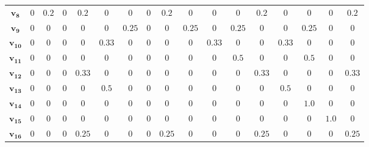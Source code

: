 \documentclass[twocolumn]{svjour3}          \smartqed
\begin{document}
\begin{table*}[ht]
{\begin{threeparttable}
\begin{tabular}{ccccccccccccccccc}
		$\mathbf{v_8}$ 		& 	$0  $	&	$0.2$	&	$0  $	& 	$0.2$
							& 	$0  $	&	$0  $	&	$0  $	& 	$0.2$
							& 	$0  $	&	$0  $	&	$0  $	& 	$0.2$
							& 	$0  $	&	$0  $	&	$0  $	& 	$0.2$	\\
							
		$\mathbf{v_9}$ 		& 	$0  $	&	$0  $	&	$0  $	& 	$0  $
							& 	$0  $	&	$0.25$	&	$0  $	& 	$0  $
							& 	$0.25$	&	$0  $	&	$0.25$	& 	$0  $
							& 	$0  $	&	$0.25$	&	$0  $	& 	$0  $	\\
							
		$\mathbf{v_{10}}$ 	& 	$0  $	&	$0  $	&	$0  $	& 	$0  $
							& 	$0.33$	&	$0  $	&	$0  $	& 	$0  $
							& 	$0  $	&	$0.33$	&	$0  $	& 	$0  $
							& 	$0.33$	&	$0  $	&	$0  $	& 	$0  $	\\
							
		$\mathbf{v_{11}}$ 	& 	$0  $	&	$0  $	&	$0  $	& 	$0  $
							& 	$0  $	&	$0  $	&	$0  $	& 	$0  $
							& 	$0  $	&	$0  $	&	$0.5$	& 	$0  $
							& 	$0  $	&	$0.5$	&	$0  $	& 	$0  $	\\
							
		$\mathbf{v_{12}}$ 	& 	$0  $	&	$0  $	&	$0  $	& 	$0.33$
							& 	$0  $	&	$0  $	&	$0  $	& 	$0  $
							& 	$0  $	&	$0  $	&	$0  $	& 	$0.33$
							& 	$0  $	&	$0  $	&	$0  $	& 	$0.33$	\\
							
		$\mathbf{v_{13}}$ 	& 	$0  $	&	$0  $	&	$0  $	& 	$0  $
							& 	$0.5$	&	$0  $	&	$0  $	& 	$0  $
							& 	$0  $	&	$0  $	&	$0  $	& 	$0  $
							& 	$0.5$	&	$0  $	&	$0  $	& 	$0  $	\\
							
		$\mathbf{v_{14}}$ 	& 	$0  $	&	$0  $	&	$0  $	& 	$0  $
							& 	$0  $	&	$0  $	&	$0  $	& 	$0  $
							& 	$0  $	&	$0  $	&	$0  $	& 	$0  $
							& 	$0  $	&	$1.0$	&	$0  $	& 	$0  $	\\
							
		$\mathbf{v_{15}}$ 	& 	$0  $	&	$0  $	&	$0  $	& 	$0  $
							& 	$0  $	&	$0  $	&	$0  $	& 	$0  $
							& 	$0  $	&	$0  $	&	$0  $	& 	$0  $
							& 	$0  $	&	$0  $	&	$1.0$	& 	$0  $	\\
							
		$\mathbf{v_{16}}$ 	& 	$0  $	&	$0  $	&	$0  $	& 	$0.25$
							& 	$0  $	&	$0  $	&	$0  $	& 	$0.25$
							& 	$0  $	&	$0  $	&	$0  $	& 	$0.25$
							& 	$0  $	&	$0  $	&	$0  $	& 	$0.25$	\\
		
		\bottomrule
		\end{tabular}
	\end{threeparttable}
	} \end{table*}
\end{document}
